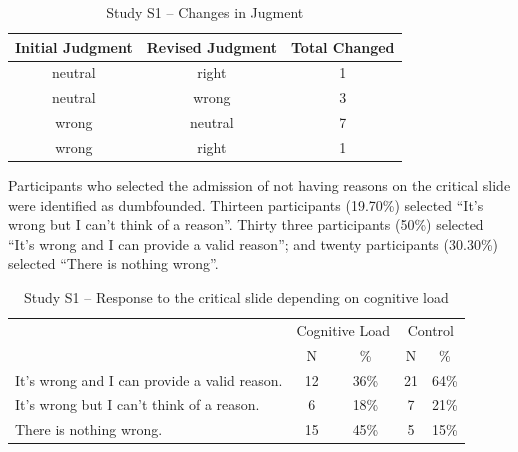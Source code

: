\documentclass[
  american,
  man,floatsintext]{apa7}
\begin{document}
\begin{table}[tbp]

\begin{center}
\begin{threeparttable}

\caption{\label{tab:tabS1change}Study S1 – Changes in Jugment}

\begin{tabular}{ccc}
\toprule
Initial Judgment & \multicolumn{1}{c}{Revised Judgment} & \multicolumn{1}{c}{Total Changed}\\
\midrule
neutral & right & 1\\
neutral & wrong & 3\\
wrong & neutral & 7\\
wrong & right & 1\\
\bottomrule
\end{tabular}

\end{threeparttable}
\end{center}

\end{table}

Participants who selected the admission of not having reasons on the critical slide were identified as dumbfounded. Thirteen participants (19.70\%) selected \enquote{It's wrong but I can't think of a reason}. Thirty three participants (50\%) selected \enquote{It's wrong and I can provide a valid reason}; and twenty participants (30.30\%) selected \enquote{There is nothing wrong}.

\begin{table}[tbp]

\begin{center}
\begin{threeparttable}

\caption{\label{tab:tabS1tab1dumb1all}Study S1 – Response to the critical slide depending on cognitive load}

\begin{tabular}{lcccc}
\toprule
 & \multicolumn{2}{c}{Cognitive Load} & \multicolumn{2}{c}{Control} \\
\cmidrule(r){2-3} \cmidrule(r){4-5}
 & \multicolumn{1}{c}{N} & \multicolumn{1}{c}{\%} & \multicolumn{1}{c}{N} & \multicolumn{1}{c}{\%}\\
\midrule
It's wrong and I can provide a valid reason. & 12 & 36\% & 21 & 64\%\\
It's wrong but I can't think of a reason. & 6 & 18\% & 7 & 21\%\\
There is nothing wrong. & 15 & 45\% & 5 & 15\%\\
\bottomrule
\end{tabular}

\end{threeparttable}
\end{center}

\end{table}
\end{document}
